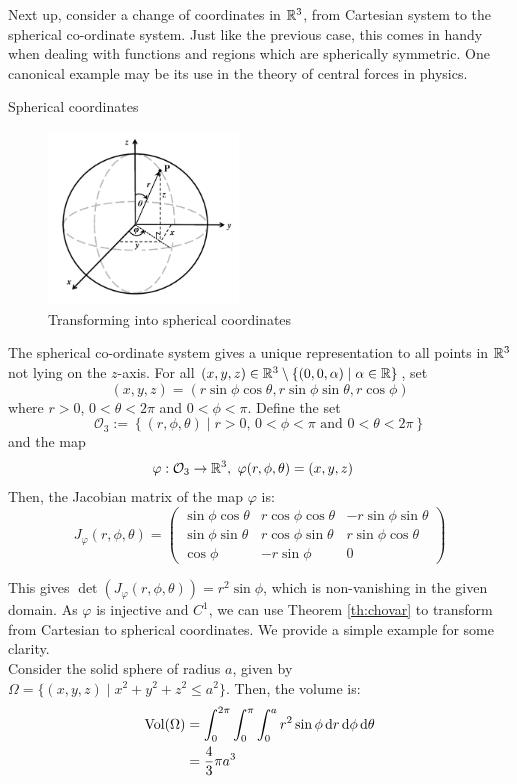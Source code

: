 \documentclass[../Analysis-3.tex]{subfiles}
\begin{document}
Next up, consider a change of coordinates in $\mathbb{R}^3$, from Cartesian system to the spherical co-ordinate system. Just like the previous case, this comes in handy when dealing with functions and regions which are spherically symmetric. One canonical example may be its use in the theory of central forces in physics.

\begin{Eg}{Spherical coordinates}{}
  \begin{figure}
    \centering
    \includegraphics[width=0.45\textwidth]{../figures/lec21.2.png}
    \caption{Transforming into spherical coordinates}
    \label{fig2:21}
  \end{figure}
  The spherical co-ordinate system gives a unique representation to all points in $\mathbb{R}^3$ not lying on the $z$-axis. For all $(x,y,z) \in \mathbb{R}^3 \setminus \{ (0,0,\alpha) \mid \alpha \in \mathbb{R} \}$, set
  \[
    (x,y,z) = (r\sin\phi\cos\theta, r\sin\phi\sin\theta, r \cos\phi)
  \]
  where $r>0$, $0 < \theta < 2\pi$ and $0 < \phi < \pi$. Define the set \[
    \mathcal{O}_3 := \left\{ (r,\phi,\theta) \mid r >0, \, 0 < \phi < \pi \mbox{ and } 0 < \theta < 2\pi \right\}
  \]
  and the map
  \begin{align*}
    \varphi : \mathcal{O}_3 & \to \mathbb{R}^3, \ \varphi(r,\phi,\theta) = (x,y,z)
  \end{align*}
  Then, the Jacobian matrix of the map $\varphi$ is:
  \[
    J_{\varphi}(r,\phi,\theta) = \begin{pmatrix}
      \sin\phi\cos\theta & r\cos\phi\cos\theta & -r\sin\phi\sin\theta \\
      \sin\phi\sin\theta & r\cos\phi\sin\theta & r\sin\phi\cos\theta  \\
      \cos\phi           & -r\sin\phi          & 0
    \end{pmatrix}
  \]


  This gives $\det(J_{\varphi}(r,\phi,\theta)) = r^2 \sin \phi$, which is non-vanishing in the given domain. As $\varphi$ is injective and $C^1$, we can use Theorem \ref{th:chovar} to transform from Cartesian to spherical coordinates. We provide a simple example for some clarity.\\

  Consider the solid sphere of radius $a$, given by $\Omega = \{ (x,y,z) \mid x^2 + y^2 + z^2 \leq a^2 \}$. Then, the volume is:
  \begin{align*}
    \operatorname{Vol}(\Omega)
     & = \int_0^{2\pi}\int_0^{\pi} \int_0^a r^2 \sin \phi \, \dd r \, \dd \phi \, \dd \theta \\
     & = \frac{4}{3}\pi a^3
  \end{align*}
\end{Eg}
\end{document}
